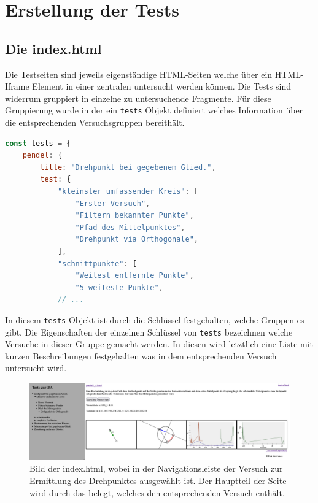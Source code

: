 
\chapter{Erstellung der Tests}


\section{Die index.html}

Die Testseiten sind jeweils eigenständige HTML-Seiten welche über ein HTML-Iframe Element in einer zentralen  untersucht werden können.
Die Tests sind widerrum gruppiert in einzelne zu untersuchende Fragmente.
Für diese Gruppierung wurde in der  ein \lstinline{tests} Objekt definiert welches Information über die entsprechenden Versuchsgruppen bereithält.

\begin{lstlisting}[language=JavaScript, caption={Ausschnitt der Definition des \lstinline{tests} Objekts in der \name{index.html}.}, label={lst:tests_objekt}]
const tests = {
    pendel: {
        title: "Drehpunkt bei gegebenem Glied.",
        test: {
            "kleinster umfassender Kreis": [
                "Erster Versuch",
                "Filtern bekannter Punkte",
                "Pfad des Mittelpunktes",
                "Drehpunkt via Orthogonale",
            ],
            "schnittpunkte": [
                "Weitest entfernte Punkte",
                "5 weiteste Punkte",
            // ...
\end{lstlisting}

In diesem \lstinline{tests} Objekt ist durch die Schlüssel festgehalten, welche Gruppen es gibt. Die Eigenschaften der einzelnen Schlüssel von \lstinline{tests} bezeichnen welche Versuche in dieser Gruppe gemacht werden.
In diesen wird letztlich eine Liste mit kurzen Beschreibungen festgehalten was in dem entsprechenden Versuch untersucht wird.

\begin{figure}
    \includegraphics[width=\textwidth]{gfx/index.png}
    \caption[Bild der index.html]{Bild der index.html, wobei in der Navigationsleiste der Versuch zur Ermittlung des Drehpunktes ausgewählt ist. Der Hauptteil der Seite wird durch das  belegt, welches den entsprechenden Versuch enthält.}\label{fig:index.html}
\end{figure}

